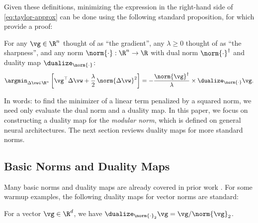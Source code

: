 Given these definitions, minimizing the expression in the right-hand side of \cref{eq:taylor-approx} can be done using the following standard proposition, for which \citet{bernstein2024old} provide a proof:
\begin{myproposition}\label{prop:steepest} For any $\vg \in \R^n$ thought of as ``the gradient'', any $\lambda \geq 0$ thought of as ``the sharpness'', and any norm $\norm{\cdot}:\R^n\to\R$ with dual norm $\norm{\cdot}^\dagger$ and duality map $\dualize_{\norm{\cdot}}$:
\begin{align}\label{eq:dual-steepest}
    \argmin_{\Delta \vw \in \R^n} \left[\vg^\top \Delta \vw + \frac{\lambda}{2} \, \norm{\Delta \vw}^2 \right] = - \frac{\norm{\vg}^\dagger}{\lambda} \times \dualize_{\norm{\cdot}} \vg.
\end{align}
\end{myproposition}
In words: to find the minimizer of a linear term penalized by a squared norm, we need only evaluate the dual norm and a duality map. In this paper, we focus on constructing a duality map for the \textit{modular norm}, which is defined on general neural architectures. The next section reviews duality maps for more standard norms.

\subsection{Basic Norms and Duality Maps}\label{sec:basic-norms}
Many basic norms and duality maps are already covered in prior work \citep{spectral-descent-1,spectral-descent-2,spectral-descent-4,flynn2017duality}. For some warmup examples, the following duality maps for vector norms are standard:
\begin{myexample} For a vector $\vg\in\R^d$, we have $\dualize_{\norm{\cdot}_2} \vg = \vg / \norm{\vg}_2$.
\end{myexample}

